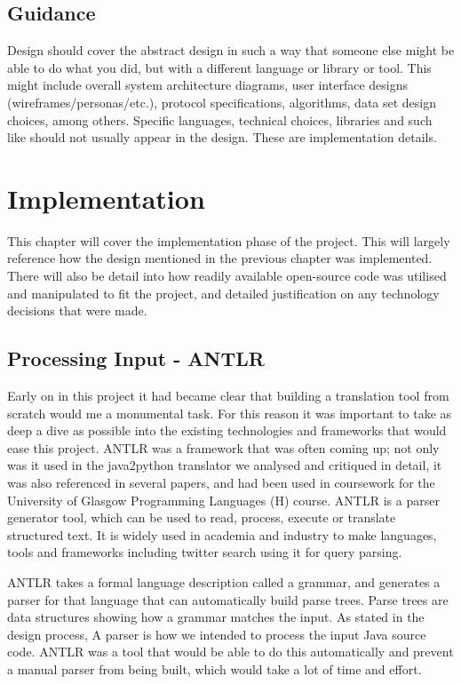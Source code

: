 \documentclass{l4proj}
\begin{document}
\section{Guidance}
Design should cover the abstract design in such a way that someone else might be able to do what you did, 
but with a different language or library or tool. This might include overall system architecture diagrams,
user interface designs (wireframes/personas/etc.), protocol specifications, algorithms, data set design choices,
among others. Specific languages, technical choices, libraries and such like should not usually appear in the design. These are implementation details.


\chapter{Implementation}
This chapter will cover the implementation phase of the project. This will largely reference how the design mentioned in the previous chapter was implemented. There will also be detail into how readily available open-source code was utilised and manipulated to fit the project, and detailed justification on any technology decisions that were made.

\section{Processing Input - ANTLR}
Early on in this project it had became clear that building a translation tool from scratch would me a monumental task. For this reason it was important to take as deep a dive as possible into the existing technologies and frameworks that would ease this project. ANTLR was a framework that was often coming up; not only was it used in the java2python translator we analysed and critiqued in detail, it was also referenced in several papers, and had been used in coursework for the University of Glasgow Programming Languages (H) course. 
ANTLR is a parser generator tool, which can be used to read, process, execute or translate structured text. It is widely used in academia and industry to make languages, tools and frameworks including twitter search using it for query parsing.

ANTLR takes a formal language description called a grammar, and generates a parser for that language that can automatically build parse trees. Parse trees are data structures showing how a grammar matches the input. 
As stated in the design process, A parser is how we intended to process the input Java source code. ANTLR was a tool that would be able to do this automatically and prevent a manual parser from being built, which would take a lot of time and effort.
\end{document}
